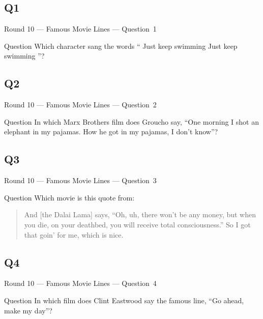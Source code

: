 \documentclass[11pt]{beamer}
\begin{document}
\subsection*{Q1}
\begin{frame}[t]{Round 10 --- Famous Movie Lines --- \mbox{Question 1}}
\vspace{-0.5em}
\begin{block}{Question}
Which character sang the words ``\Acht{} Just keep swimming \AAcht{} Just keep swimming \Acht{}''?
\end{block}
\end{frame}
\subsection*{Q2}
\begin{frame}[t]{Round 10 --- Famous Movie Lines --- \mbox{Question 2}}
\vspace{-0.5em}
\begin{block}{Question}
In which Marx Brothers film does Groucho say, ``One morning I shot an elephant in my pajamas. How he got in my pajamas, I don't know''?
\end{block}
\end{frame}
\subsection*{Q3}
\begin{frame}[t]{Round 10 --- Famous Movie Lines --- \mbox{Question 3}}
\vspace{-0.5em}
\begin{block}{Question}
Which movie is this quote from:\par\begin{quote}And [the Dalai Lama] says, ``Oh, uh, there won't be any money, but when you die, on your deathbed, you will receive total consciousness.'' So I got that goin' for me, which is nice.\end{quote}
\end{block}
\end{frame}
\subsection*{Q4}
\begin{frame}[t]{Round 10 --- Famous Movie Lines --- \mbox{Question 4}}
\vspace{-0.5em}
\begin{block}{Question}
In which film does Clint Eastwood say the famous line, ``Go ahead, make my day''?
\end{block}
\end{frame}
\end{document}
